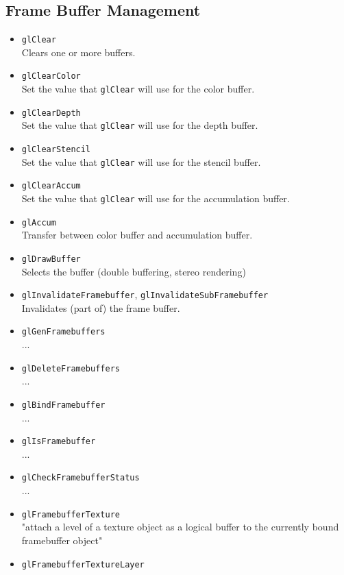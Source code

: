 \documentclass[12pt]{article}
\begin{document}
\subsection{Frame Buffer Management}
\begin{itemize}
\item \texttt{glClear} \\
	Clears one or more buffers.
\item \texttt{glClearColor} \\
	Set the value that \texttt{glClear} will use for the color buffer.
\item \texttt{glClearDepth} \\
	Set the value that \texttt{glClear} will use for the depth buffer.
\item \texttt{glClearStencil} \\
	Set the value that \texttt{glClear} will use for the stencil buffer.
\item \texttt{glClearAccum} \\
	Set the value that \texttt{glClear} will use for the accumulation buffer.
\item \texttt{glAccum} \\
	Transfer between color buffer and accumulation buffer.
\item \texttt{glDrawBuffer} \\
	Selects the buffer (double buffering, stereo rendering)
\item \texttt{glInvalidateFramebuffer}, \texttt{glInvalidateSubFramebuffer} \\
	Invalidates (part of) the frame buffer.
\item \texttt{glGenFramebuffers} \\
	...
\item \texttt{glDeleteFramebuffers} \\
	...
\item \texttt{glBindFramebuffer} \\
	...
\item \texttt{glIsFramebuffer} \\
	...
\item \texttt{glCheckFramebufferStatus} \\
	...
\item \texttt{glFramebufferTexture} \\
	"attach a level of a texture object as a logical buffer to the currently bound framebuffer object"
\item \texttt{glFramebufferTextureLayer} \\

\end{itemize}
\end{document}
